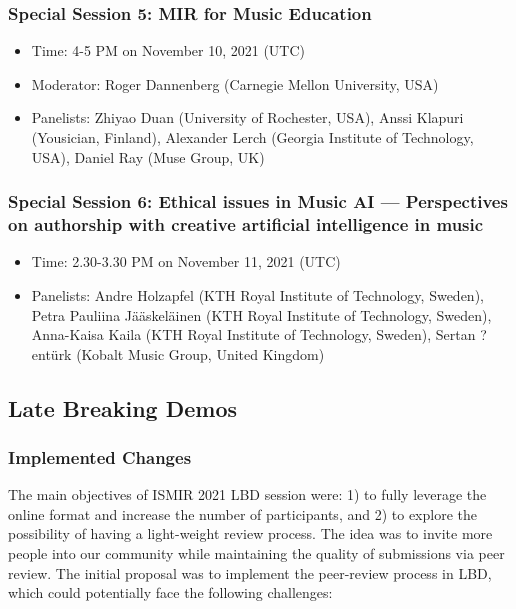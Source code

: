 \documentclass[%
10pt,								%
]
{scrartcl}
\begin{document}
        \subsubsection{Special Session 5: MIR for Music Education}
        \begin{itemize}
            \item   Time: 4-5 PM on November 10, 2021 (UTC)
            \item   Moderator: Roger Dannenberg (Carnegie Mellon University, USA)
            \item   Panelists: Zhiyao Duan (University of Rochester, USA), Anssi Klapuri (Yousician, Finland), Alexander Lerch (Georgia Institute of Technology, USA), Daniel Ray (Muse Group, UK)

        \end{itemize}

        \subsubsection{Special Session 6: Ethical issues in Music AI --- Perspectives on authorship with creative artificial intelligence in music}
        \begin{itemize}
            \item   Time: 2.30-3.30 PM on November 11, 2021 (UTC)
            \item   Panelists: Andre Holzapfel (KTH Royal Institute of Technology, Sweden), Petra Pauliina Jääskeläinen (KTH Royal Institute of Technology, Sweden), Anna-Kaisa Kaila (KTH Royal Institute of Technology, Sweden), Sertan ?entürk (Kobalt Music Group, United Kingdom) 
        \end{itemize}

    \subsection{Late Breaking Demos}
        \subsubsection{Implemented Changes}
            The main objectives of ISMIR 2021 LBD session were: 1) to fully leverage the online format and increase the number of participants, and 2) to explore the possibility of having a light-weight review process. The idea was to invite more people into our community while maintaining the quality of submissions via peer review. The initial proposal was to implement the peer-review process in LBD, which could potentially face the following challenges:
\end{document}
